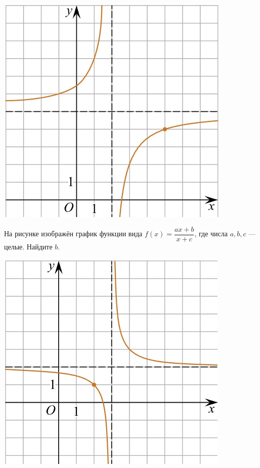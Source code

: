 \begin{class}[number=6]
\begin{listofex}
\begin{minipage}[c]{0.25\textwidth}
			\includegraphics[align=t, width=\textwidth]{pics/G101M4C6-6.jpg}
		\end{minipage}
		\item
		\begin{minipage}[t]{0.67\textwidth}
			На рисунке изображён график функции вида \(f(x)=\dfrac{ax+b}{x+c}\), где числа \(a, b, c\) --- целые. Найдите \(b\).
		\end{minipage}
		\begin{minipage}[c]{0.25\textwidth}
			\includegraphics[align=t, width=\textwidth]{pics/G101M4C6-7.jpg}
		\end{minipage}
	\end{listofex}
\end{class}
%
%
%	

